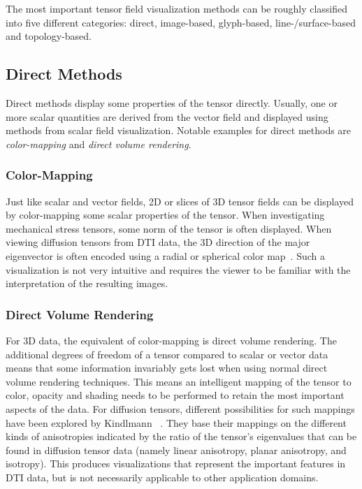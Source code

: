 %
The most important tensor field visualization methods can be roughly classified
into five different categories:
%
direct, image-based, glyph-based, line-/surface-based and topology-based.
%

\subsection{Direct Methods} %
\label{sub:tensor_direct_methods}
%
Direct methods display some properties of the tensor directly.
%
Usually, one or more scalar quantities are derived from the vector field and
displayed using methods from scalar field visualization.
%
Notable examples for direct methods are \emph{color-mapping} and \emph{direct
volume rendering}.
%

%
\subsubsection{Color-Mapping} %
%
Just like scalar and vector fields, \ac{2D} or slices of \ac{3D} tensor fields
can be displayed by color-mapping some scalar properties of the tensor.
%
When investigating mechanical stress tensors, some norm of the tensor is often
displayed.
%
When viewing diffusion tensors from \ac{DTI} data, the \ac{3D} direction of the
major eigenvector is often encoded using a radial or spherical color
map~\cite{Pajevic1999}.
%
Such a visualization is not very intuitive and requires the viewer to be
familiar with the interpretation of the resulting images.
%
%

\subsubsection{Direct Volume Rendering} %
%
For \ac{3D} data, the equivalent of color-mapping is direct volume rendering.
%
The additional degrees of freedom of a tensor compared to scalar or vector data
means that some information invariably gets lost when using normal direct volume
rendering techniques.
%
This means an intelligent mapping of the tensor to color, opacity and shading
needs to be performed to retain the most important aspects of the data.
%
For diffusion tensors, different possibilities for such mappings have been
explored by Kindlmann \etal~\cite{Kindlmann2000}.
%
They base their mappings on the different kinds of anisotropies indicated by the
ratio of the tensor's eigenvalues that can be found in diffusion tensor data
(namely linear anisotropy, planar anisotropy, and isotropy).
%
This produces visualizations that represent the important features in \ac{DTI}
data, but is not necessarily applicable to other application domains.
%

